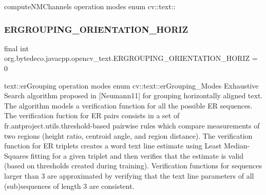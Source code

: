compute\+N\+M\+Channels operation modes enum cv\+::text\+:\+: \mbox{\label{group__text__detect_gab646588b9db6ae1e1aae89cc09ea4059}} 
\subsubsection{\texorpdfstring{E\+R\+G\+R\+O\+U\+P\+I\+N\+G\+\_\+\+O\+R\+I\+E\+N\+T\+A\+T\+I\+O\+N\+\_\+\+H\+O\+R\+IZ}{ERGROUPING\_ORIENTATION\_HORIZ}}
{\footnotesize\ttfamily final int org.\+bytedeco.\+javacpp.\+opencv\+\_\+text.\+E\+R\+G\+R\+O\+U\+P\+I\+N\+G\+\_\+\+O\+R\+I\+E\+N\+T\+A\+T\+I\+O\+N\+\_\+\+H\+O\+R\+IZ = 0\hspace{0.3cm}{\ttfamily [static]}}

text\+::er\+Grouping operation modes enum cv\+::text\+::er\+Grouping\+\_\+\+Modes Exhaustive Search algorithm proposed in \mbox{[}Neumann11\mbox{]} for grouping horizontally aligned text. The algorithm models a verification function for all the possible ER sequences. The verification fuction for ER pairs consists in a set of fr.antproject.utils.threshold-\/based pairwise rules which compare measurements of two regions (height ratio, centroid angle, and region distance). The verification function for ER triplets creates a word text line estimate using Least Median-\/\+Squares fitting for a given triplet and then verifies that the estimate is valid (based on thresholds created during training). Verification functions for sequences larger than 3 are approximated by verifying that the text line parameters of all (sub)sequences of length 3 are consistent.